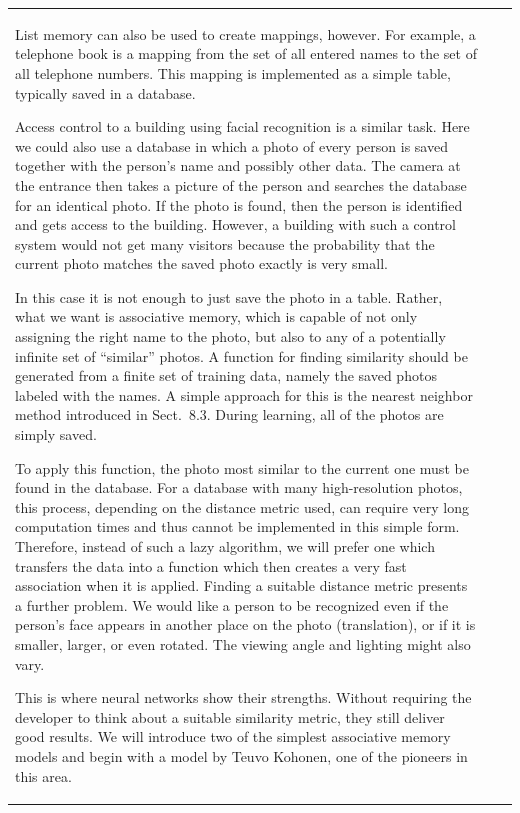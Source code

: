 \documentclass[10pt]{book}
\begin{document}
\begin{center}
\begin{tabular}{|l|l|l|}
List memory can also be used to create mappings, however. For example, a telephone book is a mapping from the set of all entered names to the set of all telephone numbers. This mapping is implemented as a simple table, typically saved in a database.

Access control to a building using facial recognition is a similar task. Here we could also use a database in which a photo of every person is saved together with the person's name and possibly other data. The camera at the entrance then takes a picture of the person and searches the database for an identical photo. If the photo is found, then the person is identified and gets access to the building. However, a building with such a control system would not get many visitors because the probability that the current photo matches the saved photo exactly is very small.

In this case it is not enough to just save the photo in a table. Rather, what we want is associative memory, which is capable of not only assigning the right name to the photo, but also to any of a potentially infinite set of ``similar'' photos. A function for finding similarity should be generated from a finite set of training data, namely the saved photos labeled with the names. A simple approach for this is the nearest neighbor method introduced in Sect.\ 8.3. During learning, all of the photos are simply saved.

To apply this function, the photo most similar to the current one must be found in the database. For a database with many high-resolution photos, this process, depending on the distance metric used, can require very long computation times and thus cannot be implemented in this simple form. Therefore, instead of such a lazy algorithm, we will prefer one which transfers the data into a function which then creates a very fast association when it is applied.
Finding a suitable distance metric presents a further problem. We would like a person to be recognized even if the person's face appears in another place on the photo (translation), or if it is smaller, larger, or even rotated. The viewing angle and lighting might also vary.

This is where neural networks show their strengths. Without requiring the developer to think about a suitable similarity metric, they still deliver good results. We will introduce two of the simplest associative memory models and begin with a model by Teuvo Kohonen, one of the pioneers in this area.


\end{tabular}
\end{center}
\end{document}
